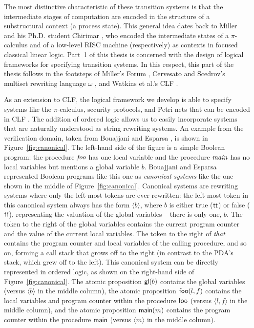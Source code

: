 The most distinctive characteristic of these transition systems is
that the intermediate stages of computation are encoded in the
structure of a substructural context (a process state). This general
idea dates back to Miller \cite{miller92pi} and his Ph.D. student
Chirimar \cite{chirimar95proof}, who encoded the intermediate states
of a $\pi$-calculus and of a low-level RISC machine (respectively) as
contexts in focused classical linear logic.  Part~1 of this thesis is
concerned with the design of logical frameworks for specifying
transition systems.  In this respect, this part of the thesis follows
in the footsteps of Miller's Forum \cite{miller96forum}, Cervesato and
Scedrov's multiset rewriting language $\omega$
\cite{cervesato09relating}, and Watkins et al.'s CLF
\cite{watkins02concurrent}. 



As an extension to CLF, the logical framework we develop is able to
specify systems like the $\pi$-calculus, security protocols, and Petri
nets that can be encoded in CLF \cite{cervesato02concurrent}. The
addition of ordered logic allows us to easily incorporate systems that
are naturally understood as string rewriting systems. An example from
the verification domain, taken from Bouajjani and Esparsa
\cite{bouajjani06rewriting}, is shown in Figure~\ref{fig:canonical}.
The left-hand side of the figure is a simple Boolean program: the
procedure ${\it foo}$ has one local variable and the procedure ${\it
  main}$ has no local variables but mentions a global variable $b$.
Bouajjani and Esparsa represented Boolean programs like this one as
{\it canonical systems} like the one shown in the middle of
Figure~\ref{fig:canonical}. Canonical systems are rewriting systems
where only the left-most tokens are ever rewritten: the left-most
token in this canonical system always has the form $\langle b \rangle$,
where $b$ is either true (${\sf tt}$) or false (${\sf ff}$),
representing the valuation of the global variables -- there is only 
one, $b$.  The token to the
right of the global variables contains the current program counter and
the value of the current local variables. The token to the right of
{\it that} contains the program counter and local variables of the calling
procedure, and so on, forming a call stack that grows off to the right
(in contrast to the PDA's stack, which grew off to the left). This
canonical system can be directly represented in ordered logic, as
shown on the right-hand side of Figure~\ref{fig:canonical}. The atomic
proposition ${\sf gl}(b)$ contains the global variables (versus
$\langle b \rangle$ in the middle column), the atomic proposition
${\sf foo}(l, f)$ contains the local variables and program counter
within the procedure ${\sf foo}$ (versus $\langle l, f \rangle$ in the
middle column), and the atomic proposition ${\sf main}(m)$ contains
the program counter within the procedure ${\sf main}$ (versus $\langle
m \rangle$ in the middle column).

